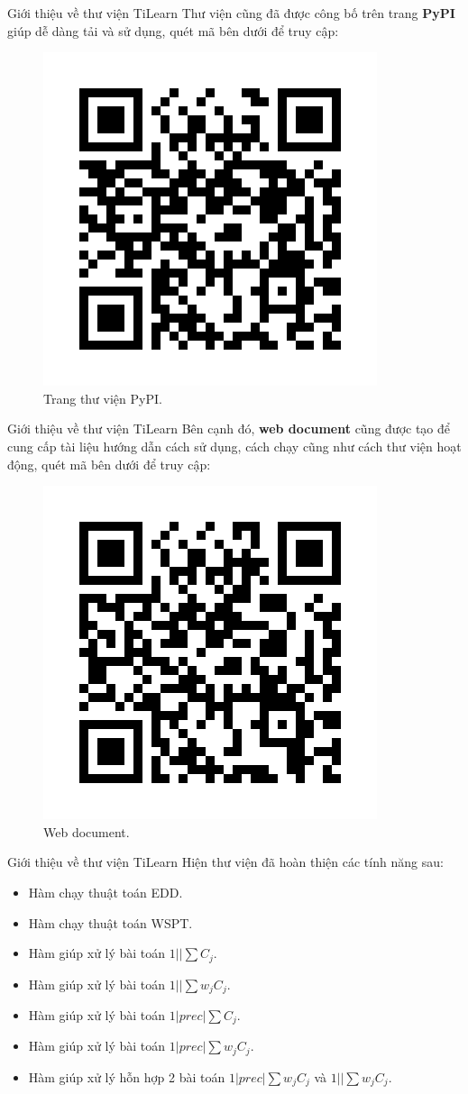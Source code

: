 \documentclass[10pt]{beamer}
\begin{document}
\begin{frame}{Giới thiệu về thư viện TiLearn}
Thư viện cũng đã được công bố trên trang \textbf{PyPI} giúp dễ dàng tải và sử dụng, quét mã bên dưới để truy cập:

\begin{figure}[h]
\centering
\includegraphics[width=0.4\linewidth]{tilearn_pypi.png}
\caption{Trang thư viện PyPI.}
\end{figure}
\end{frame}

\begin{frame}{Giới thiệu về thư viện TiLearn}
Bên cạnh đó, \textbf{web document} cũng được tạo để cung cấp tài liệu hướng dẫn cách sử dụng, cách chạy cũng như cách thư viện hoạt động, quét mã bên dưới để truy cập:

\begin{figure}[h]
\centering
\includegraphics[width=0.4\linewidth]{tilearn_docs.png}
\caption{Web document.}
\end{figure}
\end{frame}

\begin{frame}{Giới thiệu về thư viện TiLearn}
    Hiện thư viện đã hoàn thiện các tính năng sau:
    \begin{itemize}
    \item Hàm chạy thuật toán EDD.
    \medskip
    \item Hàm chạy thuật toán WSPT.
    \medskip
    \item Hàm giúp xử lý bài toán $1||\sum C_j$.
    \medskip
    \item Hàm giúp xử lý bài toán $1||\sum w_j C_j$.
    \medskip
    \item Hàm giúp xử lý bài toán $1|prec|\sum C_j$.
    \medskip
    \item Hàm giúp xử lý bài toán $1|prec|\sum w_j C_j$.
    \medskip
    \item Hàm giúp xử lý hỗn hợp 2 bài toán $1|prec|\sum w_j C_j$ và $1||\sum w_j C_j$.
    \end{itemize}
\end{frame}
\end{document}
